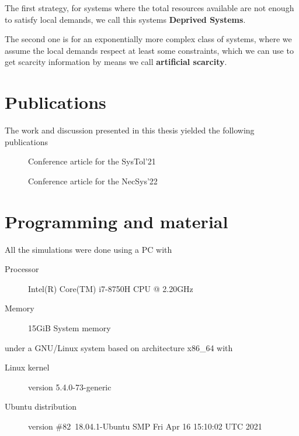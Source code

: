\documentclass[../main.tex]{subfiles}
\begin{document}
The first strategy, for systems where the total resources available are not enough to satisfy local demands, we call this systems \textbf{Deprived Systems}.

The second one is for an exponentially more complex class of systems, where we assume the local demands respect at least some constraints, which we can use to get scarcity information by means we call \textbf{artificial scarcity}.


\section{Publications}
The work and discussion presented in this thesis yielded the following publications
\begin{description}
  \item[\cite{NogueiraEtAl2021}] Conference article for the SysTol'21
  \item[\cite{NogueiraEtAl2022}] Conference article for the NecSys'22
\end{description}

\section{Programming and material}
All the simulations were done using a PC with
\begin{description}
\item [Processor] Intel(R) Core(TM) i7-8750H CPU @ 2.20GHz
\item [Memory] 15GiB System memory
\end{description}
under a GNU/Linux system based on architecture x86\_64 with
\begin{description}
    \item[Linux kernel] version 5.4.0-73-generic
    \item[Ubuntu distribution] version \#82~18.04.1-Ubuntu SMP Fri Apr 16 15:10:02 UTC 2021
\end{description}
\end{document}
